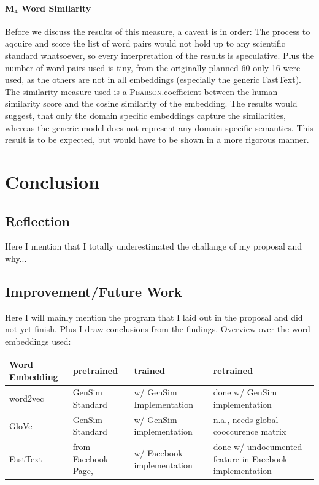 \documentclass[10pt,a4paper]{article}
\begin{document}
\paragraph{$\boldsymbol{M_4}$ Word Similarity} Before we discuss the results of this measure, a caveat is in order: The process to aqcuire and score the list of word pairs would not hold up to any scientific standard whatsoever, so every interpretation of the results is speculative. Plus the number of word pairs used is tiny, from the originally planned 60 only 16 were used, as the others are not in all embeddings (especially the generic FastText). 
The similarity measure used is a \textsc{Pearson}.coefficient between the human similarity score and the cosine similarity of the embedding. 
The results would suggest, that only the domain specific embeddings capture the similarities, whereas the generic model does not represent any domain specific semantics. This result is to be expected, but would have to be shown in a more rigorous manner.  




	\section{Conclusion}
	
	\subsection{Reflection}
	Here I mention that I totally underestimated the challange of my proposal and why...
	\subsection{Improvement/Future Work}
	Here I will mainly mention the program that I laid out in the proposal and did not yet finish. Plus I draw conclusions from the findings.
		Overview over the word embeddings used:
	\begin{center}
		\begin{tabular}{|l|p{3cm}| p{3cm}| p{3cm}|}
			\hline
			\textbf{Word Embedding} & pretrained & trained & retrained \\ 
			\hline
			word2vec  & GenSim Standard & w/ GenSim Implementation & done w/ GenSim implementation \\  
			\hline
			GloVe & GenSim Standard &w/ GenSim implementation & n.a., needs global cooccurence matrix \\  
			\hline
			FastText & from Facebook-Page,  & w/ Facebook implementation & done w/ undocumented feature in Facebook implementation\\
			\hline
      \end{tabular}	
\end{center}
\end{document}
